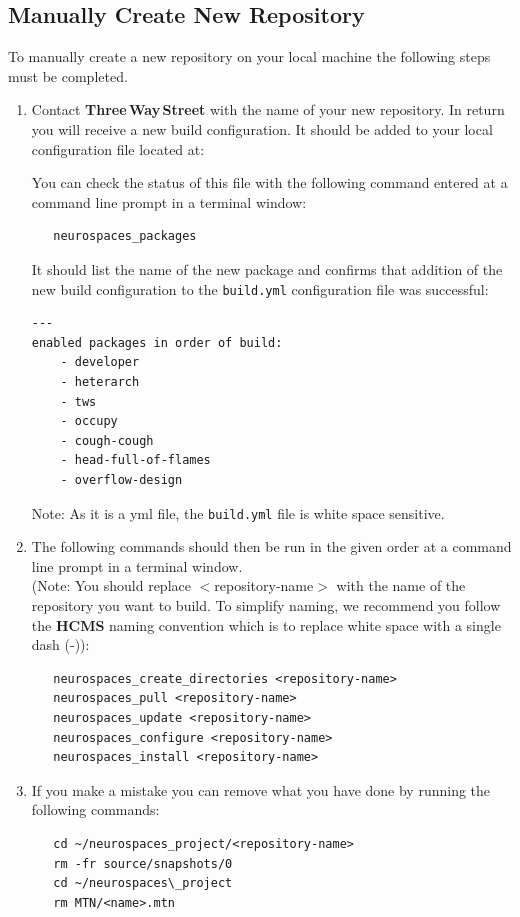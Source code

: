 \documentclass[12pt]{article}
\begin{document}
\subsection*{Manually Create New Repository}

To manually create a new repository on your local machine the following steps must be completed. 

\begin{enumerate}
\item Contact {\bf \small Three\,Way\,Street} with the name of your new repository. In return you will receive a new build configuration. It should be added to your local configuration file located at:\\
  \hspace*{5mm}{\tt /etc/neurospaces/developer/build.yml}
  
You can check the status of this file with the following command entered at a command line prompt in a terminal window:
\begin{verbatim}
   neurospaces_packages
\end{verbatim}
It should list the name of the new package and confirms that addition of the new build configuration to the {\tt \small build.yml} configuration file was successful:
\begin{verbatim}
---
enabled packages in order of build:
    - developer
    - heterarch
    - tws
    - occupy
    - cough-cough
    - head-full-of-flames
    - overflow-design
\end{verbatim}
Note: As it is a yml file, the {\tt \small build.yml} file is white space sensitive.

\item The following commands should then be run in the given order at a command line prompt  in a terminal window.\\
(Note: You should replace $<$repository-name$>$ with the name of the repository you want to build. To simplify naming, we recommend you follow the {\bf \small HCMS} naming convention which is to replace white space with a single dash (-)):
\begin{verbatim}
   neurospaces_create_directories <repository-name>
   neurospaces_pull <repository-name>
   neurospaces_update <repository-name>
   neurospaces_configure <repository-name>
   neurospaces_install <repository-name>
\end{verbatim}
\item If you make a mistake you can remove what you have done by running the following commands:
\begin{verbatim}
   cd ~/neurospaces_project/<repository-name>
   rm -fr source/snapshots/0
   cd ~/neurospaces\_project
   rm MTN/<name>.mtn
\end{verbatim}
\end{enumerate}
\end{document}
